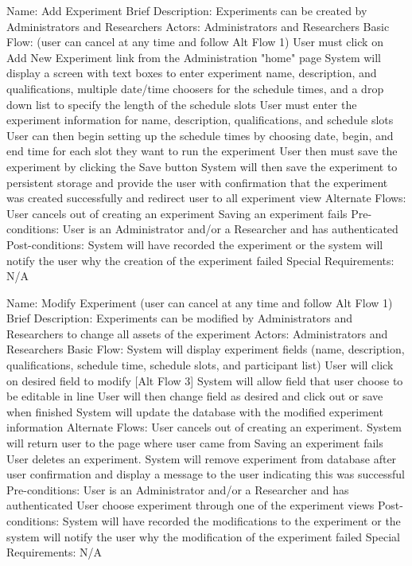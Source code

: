 \begin{outline}[enumerate]
\1 Name: Add Experiment
\2 Brief Description: Experiments can be created by Administrators and Researchers
\2 Actors: Administrators and Researchers
\2 Basic Flow: (user can cancel at any time and follow Alt Flow 1)
\3 User must click on Add New Experiment link from the Administration "home" page
\3 System will display a screen with text boxes to enter experiment name, description,  and qualifications, multiple date/time choosers for the schedule times, and a drop down list to specify the length of the schedule slots
\3 User must enter the experiment information for name, description, qualifications, and schedule slots
\3 User can then begin setting up the schedule times by choosing date, begin, and end time for each slot they want to run the experiment
\3 User then must save the experiment by clicking the Save button
\3 System will then save the experiment to persistent storage and provide the user with confirmation that the experiment was created successfully and redirect user to all experiment view
\2 Alternate Flows:
\3 User cancels out of creating an experiment
\3 Saving an experiment fails
\2 Pre-conditions:
\3 User is an Administrator and/or a Researcher and has authenticated
\2 Post-conditions:
\3 System will have recorded the experiment or the system will notify the user why the creation of the experiment failed
\2 Special Requirements:
\3 N/A

\1 Name: Modify Experiment (user can cancel at any time and follow Alt Flow 1)
\2 Brief Description: Experiments can be modified by Administrators and Researchers to change all assets of the experiment
\2 Actors: Administrators and Researchers
\2 Basic Flow:
\3 System will display experiment fields (name, description, qualifications, schedule time, schedule slots, and participant list)
\3 User will click on desired field to modify [Alt Flow 3]
\3 System will allow field that user choose to be editable in line
\3 User will then change field as desired and click out or save when finished
\3 System will update the database with the modified experiment information
\2 Alternate Flows:
\3 User cancels out of creating an experiment. System will return user to the page where user came from
\3 Saving an experiment fails
\3 User deletes an experiment. System will remove experiment from database after user confirmation and display a message to the user indicating this was successful
\2 Pre-conditions:
\3 User is an Administrator and/or a Researcher and has authenticated
\3 User choose experiment through one of the experiment views
\2 Post-conditions:
\3 System will have recorded the modifications to the experiment or the system will notify the user why the modification of the experiment failed
\2 Special Requirements:
\3 N/A



\end{outline}
